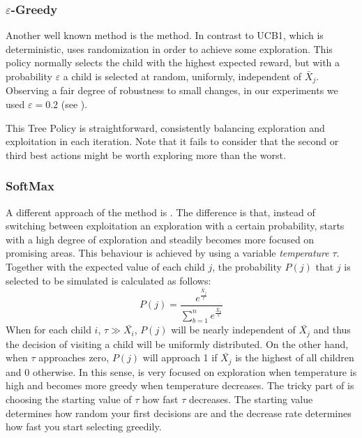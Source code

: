 \subsubsection{$\varepsilon$-Greedy}
Another well known method is the \egreedy method\cite{barto1998reinforcement}. In contrast to UCB1, which is deterministic, \egreedy uses randomization in order to achieve some exploration. This policy normally selects the child with the highest expected reward, but with a probability $\varepsilon$ a child is selected at random, uniformly, independent of $\bar{X}_j$. Observing a fair degree of robustness to small changes, in our experiments we used $\varepsilon = 0.2$ (see ).

This Tree Policy is straightforward, consistently balancing exploration and exploitation in each iteration. Note that it fails to consider that the second or third best actions might be worth exploring more than the worst.

\subsubsection{SoftMax}
\label{subsec:soft}
A different approach of the \egreedy method is \soft\cite{barto1998reinforcement}. The difference is that, instead of switching between exploitation an exploration with a certain probability, \soft starts with a high degree of exploration and steadily becomes more focused on promising areas. This behaviour is achieved by using a variable \emph{temperature} $\tau$. Together with the expected value of each child $j$, the probability $P(j)$ that $j$ is selected to be simulated is calculated as follows:  
\begin{equation}
P(j) = \frac{e^\frac{\bar{X}_j}{\tau}}{\sum_{b=1}^{n} e^\frac{\bar{X}_b}{\tau}}
\end{equation}
When for each child $i$, $\tau \gg \bar{X_i}$, $P(j)$ will be nearly independent of $\bar{X_j}$ and thus the decision of visiting a child will be uniformly distributed. On the other hand, when $\tau$ approaches zero, $P(j)$ will approach 1 if $\bar{X_j}$ is the highest of all children and 0 otherwise. In this sense, \soft is very focused on exploration when temperature is high and becomes more greedy when temperature decreases. The tricky part of \soft is choosing the starting value of $\tau$ how fast $\tau$ decreases. The starting value determines how random your first decisions are and the decrease rate determines how fast you start selecting greedily. 

